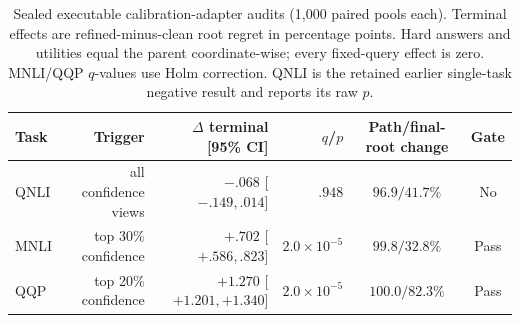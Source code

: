\begin{table}[H]
\centering
\caption{Sealed executable calibration-adapter audits (1,000 paired pools each). Terminal effects are refined-minus-clean root regret in percentage points. Hard answers and utilities equal the parent coordinate-wise; every fixed-query effect is zero. MNLI/QQP $q$-values use Holm correction. QNLI is the retained earlier single-task negative result and reports its raw $p$.}
\label{tab:step90-adapters}
\scriptsize
\setlength{\tabcolsep}{3.2pt}
\begin{tabular}{@{}lrrrcc@{}}
\toprule
Task & Trigger & $\Delta$ terminal [95\% CI] & $q$/$p$ & Path/final-root change & Gate \\
\midrule
QNLI & all confidence views & $-.068$ [$-.149,.014$] & $.948$ & $96.9/41.7\%$ & No \\
MNLI & top 30\% confidence & $+.702$ [$+.586,.823$] & $2.0\!\times\!10^{-5}$ & $99.8/32.8\%$ & Pass \\
QQP & top 20\% confidence & $+1.270$ [$+1.201,+1.340$] & $2.0\!\times\!10^{-5}$ & $100.0/82.3\%$ & Pass \\
\bottomrule
\end{tabular}
\end{table}
